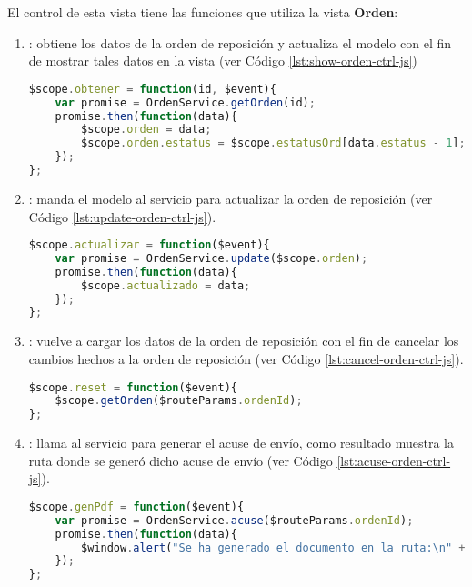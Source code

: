 El control  de esta vista tiene las funciones que utiliza la vista \textbf{Orden}:
\begin{enumerate}
	\item {}: obtiene los datos de la orden de reposición y actualiza el modelo con el fin de mostrar tales datos en la vista (ver Código \ref{lst:show-orden-ctrl-js})
\begin{lstlisting}[language=Javascript, caption={Función del controlador para llenar los datos de la vista de orden de reposición.}, captionpos=b, label={lst:show-orden-ctrl-js}]
$scope.obtener = function(id, $event){
	var promise = OrdenService.getOrden(id);
	promise.then(function(data){
		$scope.orden = data;
		$scope.orden.estatus = $scope.estatusOrd[data.estatus - 1];
	});
};
\end{lstlisting}

	\item {}: manda el modelo al servicio  para actualizar la orden de reposición (ver Código \ref{lst:update-orden-ctrl-js}).
\begin{lstlisting}[language=Javascript, caption={Función del controlador de AngularJS para actualizar una orden de reposición.}, captionpos=b, label={lst:update-orden-ctrl-js}]
$scope.actualizar = function($event){
	var promise = OrdenService.update($scope.orden);
	promise.then(function(data){
		$scope.actualizado = data;
	});
};
\end{lstlisting}

	\item {}: vuelve a cargar los datos de la orden de reposición con el fin de cancelar los cambios hechos a la orden de reposición (ver Código \ref{lst:cancel-orden-ctrl-js}).
\begin{lstlisting}[language=Javascript, caption={Función del controlador de AngularJS cancelar los cambios en una orden de reposición}, captionpos=b, label={lst:cancel-orden-ctrl-js}]
$scope.reset = function($event){
	$scope.getOrden($routeParams.ordenId);
};
\end{lstlisting}

	\item {}: llama al servicio  para generar el acuse de envío, como resultado muestra la ruta donde se generó dicho acuse de envío (ver Código \ref{lst:acuse-orden-ctrl-js}).
\begin{lstlisting}[language=Javascript, caption={Función del controlador de AngularJS para generar el acuse de envío de la orden de reposición.}, captionpos=b, label={lst:acuse-orden-ctrl-js}]
$scope.genPdf = function($event){
	var promise = OrdenService.acuse($routeParams.ordenId);
	promise.then(function(data){
		$window.alert("Se ha generado el documento en la ruta:\n" + data);
	});
};
\end{lstlisting}

\end{enumerate}

